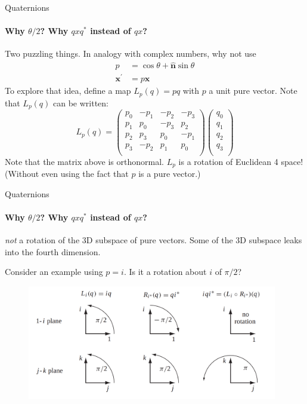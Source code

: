 \documentclass[aspectratio=169]{beamer}
\begin{document}
\begin{frame}{Quaternions}
    \framesubtitle{Why $\theta / 2$?  Why $qxq^*$ instead of $qx$?}

    Two puzzling things.  In analogy with complex numbers, why not use
    \begin{align*} 
           p &= \cos\theta + \hat{\mathbf{n}}\sin\theta \\
           \mathbf{x}^\prime &= p\mathbf{x}
    \end{align*}
    To explore that idea, define a map $L_p(q) = pq$ with $p$ a unit pure vector.
    Note that $L_p(q)$ can be written:
    \begin{equation*}
            L_p(q) = \left(\begin{array}{cccc}
                             p_0 & -p_1 & -p_2 & -p_3 \\
                             p_1 &  p_0 & -p_3 &  p_2 \\
                             p_2 &  p_3 &  p_0 & -p_1 \\
                             p_3 & -p_2 &  p_1 &  p_0 \\
                     \end{array}\right)
                     \left(\begin{array}{c}
                            q_0 \\ q_1 \\ q_2 \\ q_3 \\
                     \end{array}\right)
    \end{equation*}
    Note that the matrix above is orthonormal.  $L_p$ is a rotation of
    Euclidean 4 space!
    (Without even using the fact that $p$ is a pure vector.)
\end{frame}


\begin{frame}{Quaternions}
    \framesubtitle{Why $\theta / 2$?  Why $qxq^*$ instead of $qx$?}
    \emph{not} a rotation of the 3D subspace of pure vectors.  Some of
    the 3D subspace leaks into the fourth dimension.

    Consider an example using $p = i$.  Is it a rotation about $i$ of $\pi/2$?
    \begin{figure}[h!]
    \centerline{
    \includegraphics[height = 5cm]{images/quatrot.png}}
    \end{figure}
\end{frame}
\end{document}
